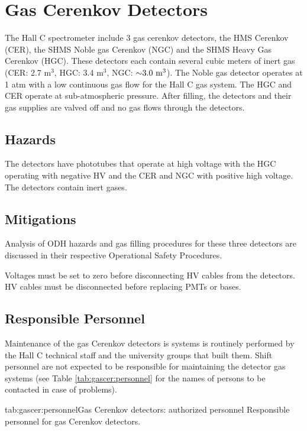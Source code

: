 %
%
\section{Gas Cerenkov Detectors}


The Hall C spectrometer include 3 gas cerenkov detectors, the HMS
Cerenkov (CER), the SHMS Noble gas Cerenkov (NGC) and the SHMS Heavy Gas
Cerenkov (HGC).  These detectors each contain several cubic meters
of inert gas (CER: 2.7 $\textrm{m}^3$, HGC: 3.4 $\textrm{m}^3$,
NGC: $\mathord{\sim} 3.0~\textrm{m}^3$).  The Noble gas detector operates at 1 atm
with a low continuous gas flow for the Hall C gas system.  The HGC and CER
operate at sub-atmospheric pressure.  After filling, the detectors and
their gas supplies are valved off and no gas flows through the detectors.

\subsection{Hazards}
The detectors have phototubes that operate at high voltage with the HGC
operating with negative HV and the CER and NGC with positive high voltage.
The detectors contain inert gases.

\subsection{Mitigations}
Analysis of ODH hazards and gas filling procedures for these three detectors
are discussed in their respective Operational Safety Procedures.

Voltages must be set to zero before disconnecting HV cables from the
detectors.  HV cables must be disconnected before replacing PMTs or bases.

\subsection{Responsible Personnel}

Maintenance of the gas Cerenkov detectors is
systems is routinely performed by the Hall C
technical staff and the university groups that built them.
Shift personnel are not expected to be responsible
for maintaining the detector gas systems (see Table
\ref{tab:gascer:personnel}
for the names of persons to be contacted in case of problems).

\begin{namestab}{tab:gascer:personnel}{Gas Cerenkov detectors: authorized personnel
}{%
      Responsible personnel for gas Cerenkov detectors.}
  \BradSawatzky{}
  \DonalDay{}
  \GarthHuber{}
\end{namestab}
